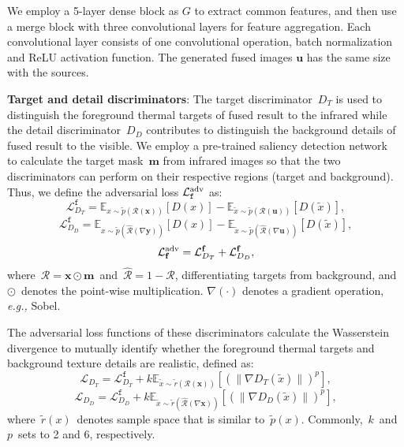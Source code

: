 \documentclass[10pt,twocolumn,letterpaper]{article}
\begin{document}
We employ a 5-layer dense block\cite{huang2019convolutional} as $G$ to extract common features, and then use a merge block with three convolutional layers for feature aggregation. Each convolutional layer consists of one convolutional operation, batch normalization and ReLU activation function. The generated fused images $\mathbf{u}$ has the same size with the sources. 

\textbf{Target and detail discriminators}: The target discriminator~$D_T$ is used to distinguish the foreground thermal targets of fused result to the infrared while the detail discriminator~$D_D$ contributes to distinguish the background details of fused result to the visible. We employ a pre-trained saliency detection network~\cite{deng2018r3net} to calculate the target mask~$\mathbf{m}$ from infrared images so that the two discriminators can perform on their respective regions (target and background). Thus, we define the adversarial loss $\mathcal{{L}}^{\rm adv}_{\mathtt{f}}$ as:
\vspace{-0.1cm} 
\begin{equation}
\mathcal{{L}}_{D_T}^{\mathtt{f}}=\mathbb{E}_{x\sim \tilde{p}({\mathcal{R}(\mathbf{x})})}[D(x)] - \mathbb{E}_{\tilde{x}\sim \tilde{p}({\mathcal{R}(\mathbf{u})})}[D(\tilde{x})],
\end{equation}
\begin{equation}
\mathcal{{L}}_{D_D}^{\mathtt{f}}=\mathbb{E}_{x\sim \tilde{p}({\mathcal{\hat{R}}(\nabla\mathbf{y})})}[D(x)] - \mathbb{E}_{\tilde{x}\sim \tilde{p}({\mathcal{\hat{R}}(\nabla\mathbf{u})})}[D(\tilde{x})],
\end{equation}
\begin{equation}
\mathcal{{L}}^{\rm adv}_{\mathbf{f}} =\mathcal{{L}}_{D_T}^\mathbf{f}+\mathcal{{L}}_{D_D}^\mathbf{f},
\end{equation}
where~$\mathcal{R} = \mathbf{x} \odot {\mathbf{m}}$~and~$\mathcal{\hat{R}} = 1 - \mathcal{R}$, differentiating targets from background, and $\odot$~denotes
the point-wise multiplication. $\nabla(\cdot)$ denotes a gradient operation, \emph{e.g.,} Sobel.

The adversarial loss functions of these discriminators calculate the Wasserstein divergence to mutually identify whether the foreground thermal targets and background texture details are realistic, defined as:
\vspace{-0.3cm} 
\begin{equation}
\mathcal{{L}}_{D_T}=\mathcal{{L}}_{D_T}^{\mathtt{f}}+ k\mathbb{E}_{\tilde{x}\sim \tilde{r}({\mathcal{R}(\mathbf{x})})}[(\lVert \nabla D_T(\tilde{x})\rVert)^{p}], \label{LDT}
\end{equation}
\begin{equation}
\mathcal{{L}}_{D_D}=\mathcal{{L}}_{D_D}^{\mathtt{f}} + k\mathbb{E}_{\tilde{x}\sim \tilde{r}({\mathcal{\hat{R}}(\nabla\mathbf{x})})}[(\lVert \nabla D_D(\tilde{x})\rVert)^{p}], \label{LDE}
\end{equation}
where~$\tilde{r}(x)$~denotes sample space that is similar to~$\tilde{p}(x)$. Commonly,~$k$~and~$p$~sets to 2 and 6, respectively.
\end{document}

